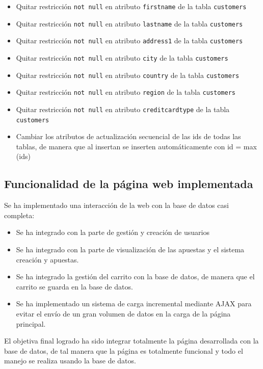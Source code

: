 \documentclass{article}
\begin{document}
\begin{itemize}
\item Quitar restricción \texttt{not null} en atributo \texttt{firstname} de la tabla \texttt{customers} 
\item Quitar restricción \texttt{not null} en atributo \texttt{lastname} de la tabla \texttt{customers} 
\item Quitar restricción \texttt{not null} en atributo \texttt{address1} de la tabla \texttt{customers} 
\item Quitar restricción \texttt{not null} en atributo \texttt{city} de la tabla \texttt{customers} 
\item Quitar restricción \texttt{not null} en atributo \texttt{country} de la tabla \texttt{customers} 
\item Quitar restricción \texttt{not null} en atributo \texttt{region} de la tabla \texttt{customers} 
\item Quitar restricción \texttt{not null} en atributo \texttt{creditcardtype} de la tabla \texttt{customers} 
\item Cambiar los atributos de actualización secuencial de las ids de todas las tablas, de manera que al insertan se inserten automáticamente con id = max (ids)
\end{itemize}

\subsection{Funcionalidad de la página web implementada}

Se ha implementado una interacción de la web con la base de datos casi completa:
\begin{itemize}
\item Se ha integrado con la parte de gestión y creación de usuarios
\item Se ha integrado con la parte de visualización de las apuestas y el sistema creación y apuestas.
\item Se ha integrado la gestión del carrito con la base de datos, de manera que el carrito se guarda en la base de datos.
\item Se ha implementado un sistema de carga incremental mediante AJAX para evitar el envío de un gran volumen de datos en la carga de la página principal.
\end{itemize}

El objetiva final logrado ha sido integrar totalmente la página desarrollada con la base de datos, de tal manera que la página es totalmente funcional y todo el manejo se realiza usando la base de datos.
\end{document}
